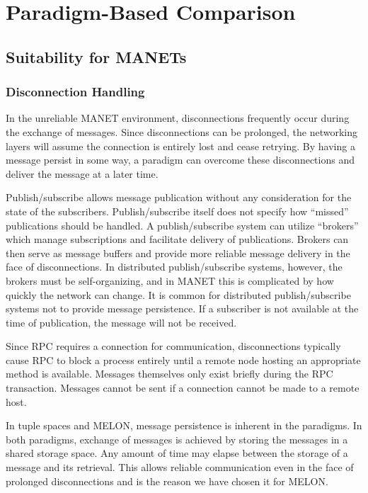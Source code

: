 \section{Paradigm-Based Comparison}\label{sec:para_eval}

\subsection{Suitability for MANETs}

\subsubsection{Disconnection Handling}\label{sec:suitabilitydisconnections}

In the unreliable MANET environment, disconnections frequently occur during the exchange of messages. Since disconnections can be prolonged, the networking layers will assume the connection is entirely lost and cease retrying. By having a message persist in some way, a paradigm can overcome these disconnections and deliver the message at a later time.

Publish/subscribe allows message publication without any consideration for the state of the subscribers. Publish/subscribe itself does not specify how ``missed'' publications should be handled. A publish/subscribe system can utilize ``brokers'' which manage subscriptions and facilitate delivery of publications. Brokers can then serve as message buffers and provide more reliable message delivery in the face of disconnections. In distributed publish/subscribe systems, however, the brokers must be self-organizing, and in MANET this is complicated by how quickly the network can change. It is common for distributed publish/subscribe systems not to provide message persistence. If a subscriber is not available at the time of publication, the message will not be received.

Since RPC requires a connection for communication, disconnections typically cause RPC to block a process entirely until a remote node hosting an appropriate method is available. Messages themselves only exist briefly during the RPC transaction. Messages cannot be sent if a connection cannot be made to a remote host.

In tuple spaces and MELON, message persistence is inherent in the paradigms. In both paradigms, exchange of messages is achieved by storing the messages in a shared storage space. Any amount of time may elapse between the storage of a message and its retrieval. This allows reliable communication even in the face of prolonged disconnections and is the reason we have chosen it for MELON.

